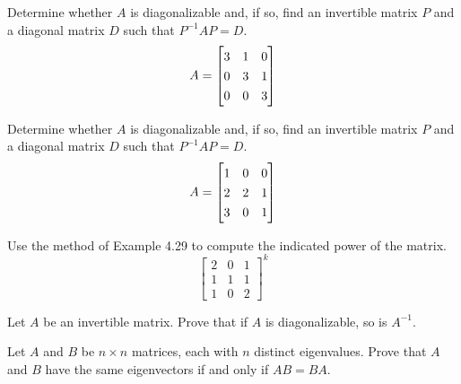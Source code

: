 \documentclass[12pt,letterpaper]{hmcpset}
\newcommand{\m}[1]{\renewcommand*{\arraystretch}{1.3} \begin{bmatrix} #1 \end{bmatrix}}
\begin{document}

\begin{problem}[4.4.10]
	Determine whether $A$ is diagonalizable and, if so, find an invertible matrix $P$ and a diagonal matrix $D$ such that $P^{-1}AP = D$.
  $$ A = \m{3 & 1 & 0 \\ 0 & 3 & 1 \\ 0 & 0 & 3} $$
\end{problem}

\begin{solution}
\vfill
\end{solution}
\newpage

\begin{problem}[4.4.12]
	Determine whether $A$ is diagonalizable and, if so, find an invertible matrix $P$ and a diagonal matrix $D$ such that $P^{-1}AP = D$.
  $$ A = \m{1 & 0 & 0 \\ 2 & 2 & 1 \\ 3 & 0 & 1} $$
\end{problem}

\begin{solution}
\vfill
\end{solution}
\newpage

\begin{problem}[4.4.22]
	Use the method of Example 4.29 to compute the indicated power of the matrix.
	$$ \m{2 & 0 & 1 \\ 1 & 1 & 1 \\ 1 & 0 & 2}^k $$
\end{problem}

\begin{solution}
\vfill
\end{solution}
\newpage

\begin{problem}[4.4.44]
	Let $A$ be an invertible matrix. Prove that if $A$ is diagonalizable, so is $A^{-1}$.

\end{problem}

\begin{solution}
\vfill
\end{solution}
\newpage

\begin{problem}[4.4.46]
	Let $A$ and $B$ be $n \times n$ matrices, each with $n$ distinct eigenvalues. Prove that $A$ and $B$ have the same eigenvectors if and only if $AB = BA$.

\end{problem}
\end{document}

